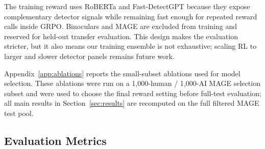 \documentclass[11pt]{article}
\begin{document}
The training reward uses RoBERTa and Fast-DetectGPT because they expose complementary detector signals while remaining fast enough for repeated reward calls inside GRPO. Binoculars and MAGE are excluded from training and reserved for held-out transfer evaluation. This design makes the evaluation stricter, but it also means our training ensemble is not exhaustive; scaling RL to larger and slower detector panels remains future work.

Appendix~\ref{app:ablations} reports the small-subset ablations used for model selection. These ablations were run on a 1,000-human / 1,000-AI MAGE selection subset and were used to choose the final reward setting before full-test evaluation; all main results in Section~\ref{sec:results} are recomputed on the full filtered MAGE test pool.

\subsection{Evaluation Metrics}
\end{document}
